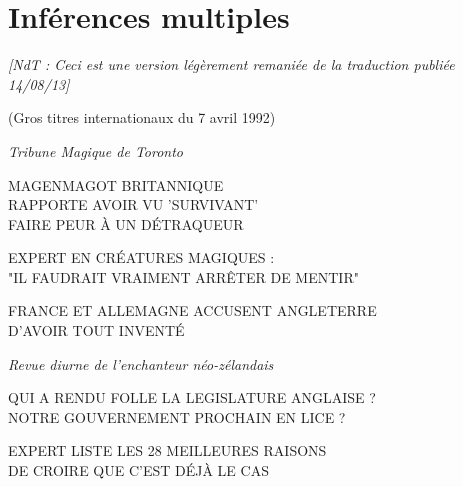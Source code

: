 
\chapter{Inférences multiples}

\emph{[NdT : Ceci est une version légèrement remaniée de la traduction publiée 14/08/13]} 


\begin{center}(Gros titres internationaux du 7 avril 1992)\end{center}



\begin{center}\emph{Tribune Magique de Toronto} \end{center}



\begin{center}MAGENMAGOT BRITANNIQUE\\RAPPORTE AVOIR VU 'SURVIVANT'\\FAIRE PEUR À UN DÉTRAQUEUR\end{center}



\begin{center}EXPERT EN CRÉATURES MAGIQUES :\\"IL FAUDRAIT VRAIMENT ARRÊTER DE MENTIR"\end{center}



\begin{center}FRANCE ET ALLEMAGNE ACCUSENT ANGLETERRE\\D'AVOIR TOUT INVENTÉ\end{center}



\begin{center}\emph{Revue diurne de l'enchanteur néo-zélandais} \end{center}



\begin{center}QUI A RENDU FOLLE LA LEGISLATURE ANGLAISE ?\\NOTRE GOUVERNEMENT PROCHAIN EN LICE ?\end{center}



\begin{center}EXPERT LISTE LES 28 MEILLEURES RAISONS\\DE CROIRE QUE C'EST DÉJÀ LE CAS\end{center}



